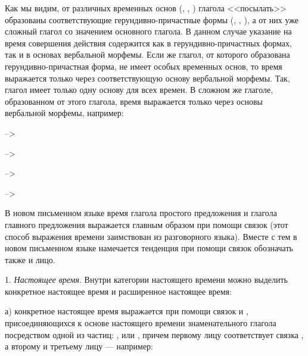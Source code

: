 Как мы видим, от различных временных основ (, , ) глагола <<посылать>> образованы соответствующие герундивно-причастные формы (, , ), а от них уже сложный глагол со значением основного глагола. В данном случае указание на время совершения действия содержится как в герундивно-причастных формах, так и в основах вербальной морфемы. Если же глагол, от которого образована герундивно-причастная форма, не имеет особых временных основ, то время выражается только через соответствующую основу вербальной морфемы. Так, глагол
 имеет только одну основу для всех времен. В сложном же глаголе, образованном от этого глагола, время выражается только через основы вербальной морфемы, например:

\begin{description}
	\item{}-->
	\item-->
	\item-->
	\item-->
\end{description}

В новом письменном языке время глагола простого предложения и глагола главного предложения выражается главным образом при помощи связок (этот способ выражения
времени заимствован из разговорного языка). Вместе с тем в новом письменном языке намечается тенденция при помощи связок обозначать также и лицо.

1. \emph{Настоящее время}. Внутри категории настоящего времени можно выделить конкретное настоящее время и расширенное настоящее время:

а) конкретное настоящее время выражается при помощи связок  и , присоединяющихся к основе настоящего времени знаменательного глагола посредством одной из частиц: ,  или , причем первому лицу соответствует связка , а второму и третьему лицу ---  например:

\begin{description}
	\item{}
	\item{}
	\item{}
\end{description}

